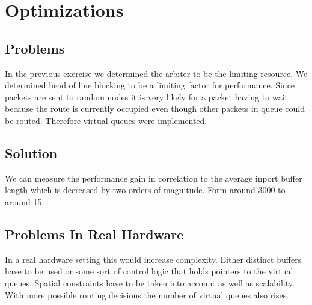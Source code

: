 \documentclass[]{scrartcl}
\begin{document}
\section{Optimizations}
\subsection{Problems}
In the previous exercise we determined the arbiter to be the limiting resource.
We determined head of line blocking to be a limiting factor for performance.
Since packets are sent to random nodes it is very likely for a packet having to
wait because the route is currently occupied even though other packets in queue
could be routed.
Therefore virtual queues were implemented.

\subsection{Solution}
We can measure the performance gain in correlation to the average inport buffer
length which is decreased by two orders of magnitude. Form around 3000 to around
15

\subsection{Problems In Real Hardware}
In a real hardware setting this would increase complexity.
Either distinct buffers have to be used or some sort of control logic that holds
pointers to the virtual queues. Spatial constraints have to be taken into account
as well as scalability. With more possible routing decisions the number of virtual
queues also rises.
\end{document}

